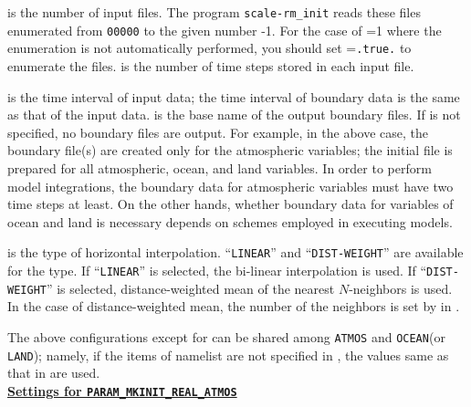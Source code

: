  is the number of input files. 
The program \verb|scale-rm_init| reads these files enumerated from \verb|00000| to the given number -1. 
For the case of =1 where the enumeration is not automatically performed, you should set =\verb|.true.| to enumerate the files.  
 is the number of time steps stored in each input file.

 is the time interval of input data; the time interval of boundary data is the same as that of the input data.
 is the base name of the output boundary files.
If  is not specified, no boundary files are output.
For example, in the above case, the boundary file(s) are created only for the atmospheric variables; the initial file is prepared for all atmospheric, ocean, and land variables.
In order to perform model integrations, the boundary data for atmospheric variables must have two time steps at least.  
On the other hands, whether boundary data for variables of ocean and land is necessary depends on schemes employed in executing models. 

 is the type of horizontal interpolation.
``\verb|LINEAR|'' and ``\verb|DIST-WEIGHT|'' are available for the type.
If ``\verb|LINEAR|'' is selected, the bi-linear interpolation is used.
If ``\verb|DIST-WEIGHT|'' is selected, distance-weighted mean of the nearest $N$-neighbors is used.
In the case of distance-weighted mean, the number of the neighbors is set by  in .

The above configurations except for  can be shared among \verb|ATMOS| and \verb|OCEAN|(or \verb|LAND|); 
namely, if the items of namelist are not specified in ,
the values same as that in  are used.
\\

\noindent\textbf{\underline{Settings for \texttt{PARAM\_MKINIT\_REAL\_ATMOS}}}

